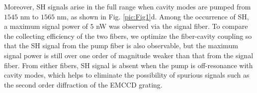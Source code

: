 \documentclass[a4paper,8pt,hyperref, twocolumn]{article}
\begin{document}
Moreover, SH signals arise in the full range when cavity modes are pumped from $1545$ nm to $1565$ nm, as shown in Fig. \ref{pic:Fig1}d.
Among the occurrence of SH, a maximum signal power of $5$ nW was observed via the signal fiber. To compare the collecting efficiency of the two fibers, we optimize the fiber-cavity coupling so that the SH signal from the pump fiber is also observable, but the maximum signal power is still over one order of magnitude weaker than that from the signal fiber. From either fibers, SH signal is absent when the pump is off-resonance with cavity modes, which helps to eliminate the possibility of spurious signals such as the second order diffraction of the EMCCD grating.






\end{document}
